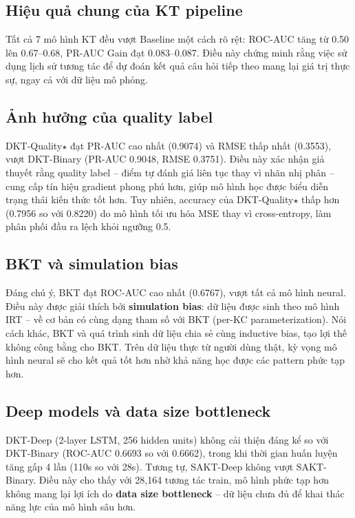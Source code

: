 \subsection{Hiệu quả chung của KT pipeline}

Tất cả 7 mô hình KT đều vượt Baseline một cách rõ rệt: ROC-AUC tăng từ 0.50 lên 0.67--0.68, PR-AUC Gain đạt 0.083--0.087. Điều này chứng minh rằng việc sử dụng lịch sử tương tác để dự đoán kết quả câu hỏi tiếp theo mang lại giá trị thực sự, ngay cả với dữ liệu mô phỏng.

\subsection{Ảnh hưởng của quality label}

DKT-Quality$\star$ đạt PR-AUC cao nhất (0.9074) và RMSE thấp nhất (0.3553), vượt DKT-Binary (PR-AUC 0.9048, RMSE 0.3751). Điều này xác nhận giả thuyết rằng quality label -- điểm tự đánh giá liên tục thay vì nhãn nhị phân -- cung cấp tín hiệu gradient phong phú hơn, giúp mô hình học được biểu diễn trạng thái kiến thức tốt hơn. Tuy nhiên, accuracy của DKT-Quality$\star$ thấp hơn (0.7956 so với 0.8220) do mô hình tối ưu hóa MSE thay vì cross-entropy, làm phân phối đầu ra lệch khỏi ngưỡng 0.5.

\subsection{BKT và simulation bias}

Đáng chú ý, BKT đạt ROC-AUC cao nhất (0.6767), vượt tất cả mô hình neural. Điều này được giải thích bởi \textbf{simulation bias}: dữ liệu được sinh theo mô hình IRT -- về cơ bản có cùng dạng tham số với BKT (per-KC parameterization). Nói cách khác, BKT và quá trình sinh dữ liệu chia sẻ cùng inductive bias, tạo lợi thế không công bằng cho BKT. Trên dữ liệu thực từ người dùng thật, kỳ vọng mô hình neural sẽ cho kết quả tốt hơn nhờ khả năng học được các pattern phức tạp hơn.

\subsection{Deep models và data size bottleneck}

DKT-Deep (2-layer LSTM, 256 hidden units) không cải thiện đáng kể so với DKT-Binary (ROC-AUC 0.6693 so với 0.6662), trong khi thời gian huấn luyện tăng gấp 4 lần (110s so với 28s). Tương tự, SAKT-Deep không vượt SAKT-Binary. Điều này cho thấy với 28{,}164 tương tác train, mô hình phức tạp hơn không mang lại lợi ích do \textbf{data size bottleneck} -- dữ liệu chưa đủ để khai thác năng lực của mô hình sâu hơn.

